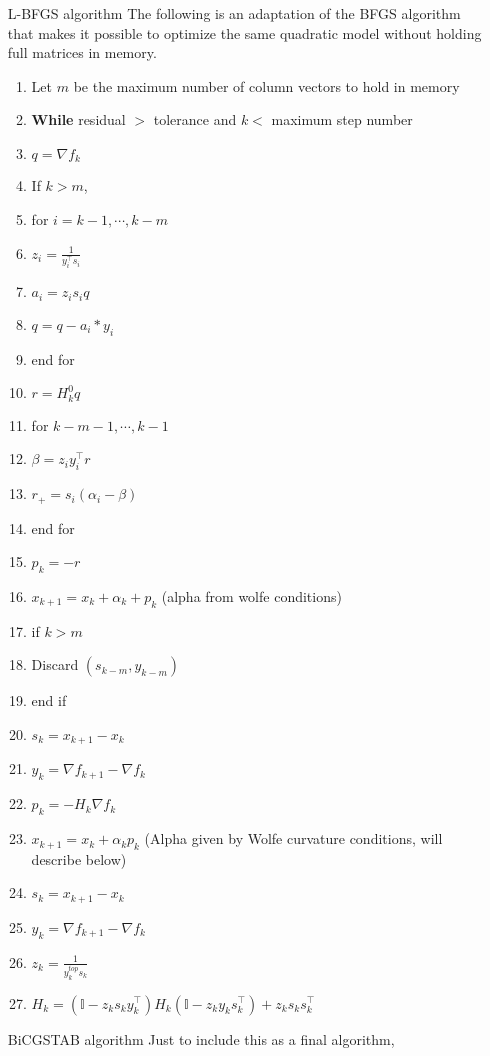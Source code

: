 \begin{itemize}
\item[L-BFGS algorithm]
The following is an adaptation of the BFGS algorithm that makes it possible to optimize the
same quadratic model without holding full matrices in memory.

\begin{enumerate}
\item Let $m$ be the maximum number of column vectors to hold in memory
\item \textbf{While} residual $>$ tolerance and $k<$ maximum step number
\item $q = \nabla f_k$
\item If $k>m$,
\item for $i = k-1 ,\cdots , k-m$
\item $z_i = \frac{1}{y_i^{\top} s_i}$
\item $a_i = z_i s_i q$
\item $q = q - a_i*y_i$
\item end for
\item $r = H_k^{0}q$
\item for $k-m-1,\cdots, k-1$
\item $\beta = z_i y_i^{\top} r$
\item $r_+ = s_i (\alpha_i - \beta)$
\item end for
\item $p_k = -r$
\item $x_{k+1} = x_k + \alpha_k + p_k$ (alpha from wolfe conditions)
\item if $k>m$
\item Discard $(s_{k-m},y_{k-m})$
\item end if
\item $s_k = x_{k+1} - x_k$
\item $y_k = \nabla f_{k+1} - \nabla f_k$
\item $p_k = -H_k \nabla f_k$
\item $x_{k+1} = x_k + \alpha_k p_k$ (Alpha given by Wolfe curvature conditions, will describe below)
\item $s_k = x_{k+1} - x_k$
\item $y_k = \nabla f_{k+1} - \nabla f_{k}$
\item $z_k = \frac{1}{y_k^{top}s_k}$
\item $H_k = (\mathbb{I}-z_k s_k y_k^{\top})H_k(\mathbb{I}-z_k y_k s_k^{\top}) + z_k s_k s_k^{\top}$
\end{enumerate}

\item[BiCGSTAB algorithm]
Just to include this as a final algorithm,


\end{itemize}
